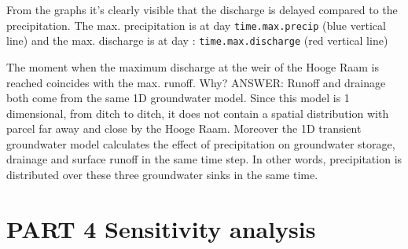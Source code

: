 \documentclass[
]{article}
\newenvironment{Shaded}{\begin{snugshade}}{\end{snugshade}}
\newcommand{\AttributeTok}[1]{\textcolor[rgb]{0.13,0.29,0.53}{#1}}
\newcommand{\DecValTok}[1]{\textcolor[rgb]{0.00,0.00,0.81}{#1}}
\newcommand{\FunctionTok}[1]{\textcolor[rgb]{0.13,0.29,0.53}{\textbf{#1}}}
\newcommand{\NormalTok}[1]{#1}
\newcommand{\OtherTok}[1]{\textcolor[rgb]{0.56,0.35,0.01}{#1}}
\newcommand{\SpecialCharTok}[1]{\textcolor[rgb]{0.81,0.36,0.00}{\textbf{#1}}}
\newcommand{\StringTok}[1]{\textcolor[rgb]{0.31,0.60,0.02}{#1}}
\begin{document}
\begin{Shaded}
\end{Shaded}

From the graphs it's clearly visible that the discharge is delayed
compared to the precipitation. The max. precipitation is at day
\texttt{time.max.precip} (blue vertical line) and the max. discharge is
at day : \texttt{time.max.discharge} (red vertical line)

The moment when the maximum discharge at the weir of the Hooge Raam is
reached coincides with the max. runoff. Why? ANSWER: Runoff and drainage
both come from the same 1D groundwater model. Since this model is 1
dimensional, from ditch to ditch, it does not contain a spatial
distribution with parcel far away and close by the Hooge Raam. Moreover
the 1D transient groundwater model calculates the effect of
precipitation on groundwater storage, drainage and surface runoff in the
same time step. In other words, precipitation is distributed over these
three groundwater sinks in the same time.

\hypertarget{part-4-sensitivity-analysis}{%
\section{PART 4 Sensitivity
analysis}\label{part-4-sensitivity-analysis}}
\end{document}
